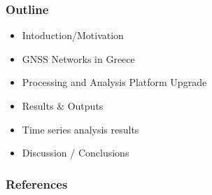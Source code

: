 \documentclass[aspectratio=169, customfont, printbib]{Classes/beamerPub}%
\begin{document}
\maketitle

\begin{frame}
  \frametitle{Outline}
    \begin{itemize}\setlength\itemsep{1em}
        \item Intoduction/Motivation
        \item GNSS Networks in Greece
        \item Processing and Analysis Platform Upgrade
        \item Results \& Outputs
        \item Time series analysis results
        \item Discussion / Conclusions
      \end{itemize}
\end{frame}





\makethanku %

\ifdefinePrintbib
  \begin{frame}[t,allowframebreaks]
    \frametitle{References}
    \printbibliography
  \end{frame}
\fi

% 


\end{document}
